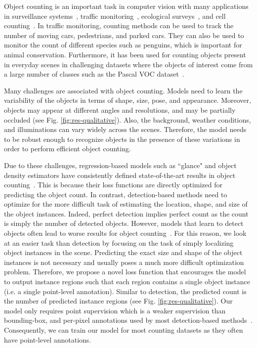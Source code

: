 \documentclass[runningheads]{llncs}
\begin{document}
Object counting is an important task in computer vision with many applications in surveillance systems~\cite{wang2011automatic,zen2012enhanced}, traffic monitoring~\cite{de2015pklot,TRANCOSdataset_IbPRIA2015}, ecological surveys~\cite{arteta2016counting}, and cell counting~\cite{cohen2017count,lempitsky2010learning}. In traffic monitoring, counting methods can be used to track the number of moving cars, pedestrians, and parked cars. They can also be used to monitor the count of different species such as penguins, which is important for animal conservation. Furthermore, it has been used for counting objects present in everyday scenes in challenging datasets where the objects of interest come from a large number of classes such as the Pascal VOC dataset~\cite{everingham2015pascal}.



Many challenges are associated with object counting. Models need to learn the variability of the objects in terms of shape, size, pose, and appearance. Moreover, objects may appear at different angles and resolutions, and may be partially occluded (see Fig. \ref{fig:res-qualitative}). Also, the background, weather conditions, and illuminations can vary widely across the scenes. Therefore, the model needs to be robust enough to recognize objects in the presence of these variations in order to perform efficient object counting.

Due to these challenges, regression-based models such as ``glance" and object density estimators have consistently defined state-of-the-art results in object counting~\cite{chattopadhyay2016counting,onoro2016towards}. This is because their loss functions are directly optimized for predicting the object count. In contrast, detection-based methods need to optimize for the more difficult task of estimating the location, shape, and size of the object instances. Indeed, perfect detection implies perfect count as the count is simply the number of detected objects. However, models that learn to detect objects often lead to worse results for object counting~\cite{chattopadhyay2016counting}.
For this reason, we look at an easier task than detection by focusing on the  task of simply localizing object instances in the scene. Predicting the exact size and shape of the object instances is not necessary and usually poses a much more difficult optimization problem. Therefore, we propose a novel loss function that encourages the model to output instance regions such that each region contains a single object instance (i.e. a single point-level annotation). Similar to detection, the predicted count is the number of predicted instance regions (see Fig. \ref{fig:res-qualitative}). Our model only requires point supervision which is a weaker supervision than bounding-box, and per-pixel annotations used by most detection-based methods~\cite{ren2015faster,redmon2016you,bai2017deep}. Consequently, we can train our model for most counting datasets as they often have point-level annotations.
\end{document}
